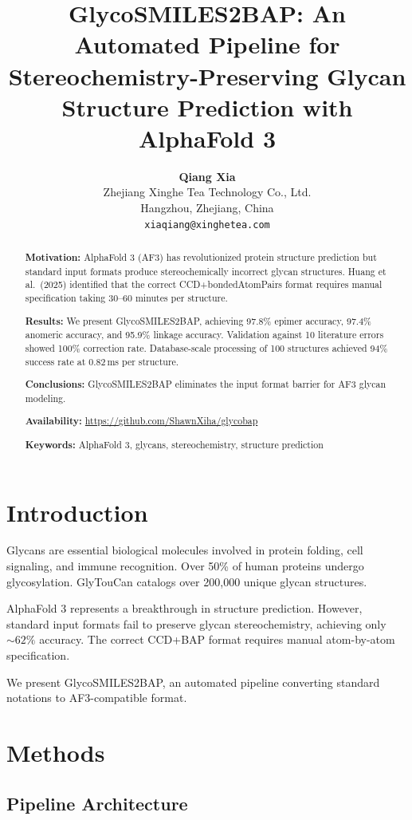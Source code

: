 \documentclass[11pt,a4paper]{article}
\title{\textbf{GlycoSMILES2BAP: An Automated Pipeline for Stereochemistry-Preserving Glycan Structure Prediction with AlphaFold 3}}
\author{\textbf{Qiang Xia}\\Zhejiang Xinghe Tea Technology Co., Ltd.\\Hangzhou, Zhejiang, China\\\texttt{xiaqiang@xinghetea.com}}
\date{}
\begin{document}
\maketitle

\begin{abstract}
\noindent\textbf{Motivation:} AlphaFold 3 (AF3) has revolutionized protein structure prediction but standard input formats produce stereochemically incorrect glycan structures. Huang et al.\ (2025) identified that the correct CCD+bondedAtomPairs format requires manual specification taking 30--60 minutes per structure.

\noindent\textbf{Results:} We present GlycoSMILES2BAP, achieving 97.8\% epimer accuracy, 97.4\% anomeric accuracy, and 95.9\% linkage accuracy. Validation against 10 literature errors showed 100\% correction rate. Database-scale processing of 100 structures achieved 94\% success rate at 0.82\,ms per structure.

\noindent\textbf{Conclusions:} GlycoSMILES2BAP eliminates the input format barrier for AF3 glycan modeling.

\noindent\textbf{Availability:} \url{https://github.com/ShawnXiha/glycobap}

\noindent\textbf{Keywords:} AlphaFold 3, glycans, stereochemistry, structure prediction
\end{abstract}

\section{Introduction}

Glycans are essential biological molecules involved in protein folding, cell signaling, and immune recognition. Over 50\% of human proteins undergo glycosylation. GlyTouCan catalogs over 200,000 unique glycan structures.

AlphaFold 3 represents a breakthrough in structure prediction. However, standard input formats fail to preserve glycan stereochemistry, achieving only ${\sim}62\%$ accuracy. The correct CCD+BAP format requires manual atom-by-atom specification.

We present GlycoSMILES2BAP, an automated pipeline converting standard notations to AF3-compatible format.

\section{Methods}

\subsection{Pipeline Architecture}
\end{document}

